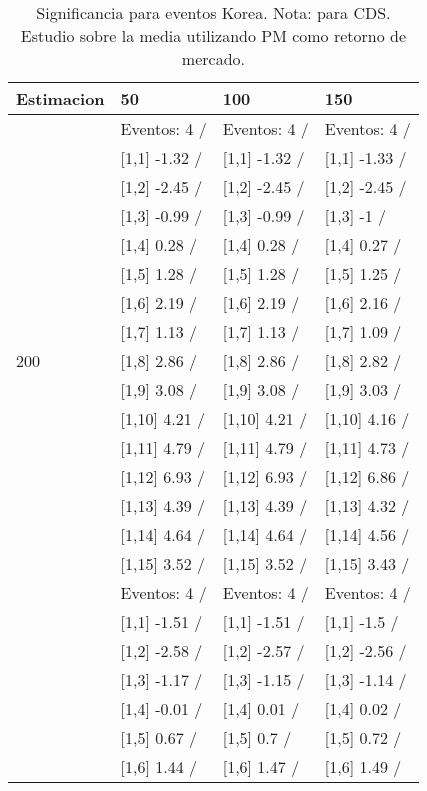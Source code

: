 \begin{table}

\caption{Significancia para eventos Korea. Nota: para CDS. Estudio sobre la media utilizando PM como retorno de mercado.}
\centering
\begin{tabular}[t]{llll}
\toprule
Estimacion & 50 & 100 & 150\\
\midrule
 & Eventos:  4 / & Eventos:  4 / & Eventos:  4 /\\
 & {}[1,1] -1.32  / & {}[1,1] -1.32  / & {}[1,1] -1.33  /\\
 & {}[1,2] -2.45  / & {}[1,2] -2.45  / & {}[1,2] -2.45  /\\
 & {}[1,3] -0.99  / & {}[1,3] -0.99  / & {}[1,3] -1  /\\
 & {}[1,4] 0.28  / & {}[1,4] 0.28  / & {}[1,4] 0.27  /\\
\addlinespace
 & {}[1,5] 1.28  / & {}[1,5] 1.28  / & {}[1,5] 1.25  /\\
 & {}[1,6] 2.19  / & {}[1,6] 2.19  / & {}[1,6] 2.16  /\\
 & {}[1,7] 1.13  / & {}[1,7] 1.13  / & {}[1,7] 1.09  /\\
200 & {}[1,8] 2.86  / & {}[1,8] 2.86  / & {}[1,8] 2.82  /\\
 & {}[1,9] 3.08  / & {}[1,9] 3.08  / & {}[1,9] 3.03  /\\
\addlinespace
 & {}[1,10] 4.21  / & {}[1,10] 4.21  / & {}[1,10] 4.16  /\\
 & {}[1,11] 4.79  / & {}[1,11] 4.79  / & {}[1,11] 4.73  /\\
 & {}[1,12] 6.93  / & {}[1,12] 6.93  / & {}[1,12] 6.86  /\\
 & {}[1,13] 4.39  / & {}[1,13] 4.39  / & {}[1,13] 4.32  /\\
 & {}[1,14] 4.64  / & {}[1,14] 4.64  / & {}[1,14] 4.56  /\\
\addlinespace
 & {}[1,15] 3.52  / & {}[1,15] 3.52  / & {}[1,15] 3.43  /\\
 & Eventos:  4 / & Eventos:  4 / & Eventos:  4 /\\
 & {}[1,1] -1.51  / & {}[1,1] -1.51  / & {}[1,1] -1.5  /\\
 & {}[1,2] -2.58  / & {}[1,2] -2.57  / & {}[1,2] -2.56  /\\
 & {}[1,3] -1.17  / & {}[1,3] -1.15  / & {}[1,3] -1.14  /\\
\addlinespace
 & {}[1,4] -0.01  / & {}[1,4] 0.01  / & {}[1,4] 0.02  /\\
 & {}[1,5] 0.67  / & {}[1,5] 0.7  / & {}[1,5] 0.72  /\\
 & {}[1,6] 1.44  / & {}[1,6] 1.47  / & {}[1,6] 1.49  /\\

\end{tabular}
\end{table}
